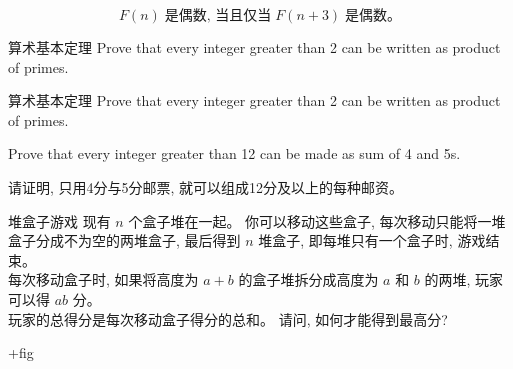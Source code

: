 
\begin{frame}{}
  \begin{exampleblock}{}
    \[
      F(n) \;\text{是偶数, 当且仅当}\; F(n+3) \;\text{是偶数。}
    \]
  \end{exampleblock}
\end{frame}

\begin{frame}{}
  \begin{exampleblock}{算术基本定理}
    Prove that every integer greater than 2 can be written as product of primes.
  \end{exampleblock}
\end{frame}

\begin{frame}{}
  \begin{exampleblock}{算术基本定理}
    Prove that every integer greater than 2 can be written as product of primes.
  \end{exampleblock}
\end{frame}

\begin{frame}{}
  \begin{exampleblock}{}
    Prove that every integer greater than 12 can be made as sum of 4 and 5s.

    请证明, 只用4分与5分邮票, 就可以组成12分及以上的每种邮资。
  \end{exampleblock}
\end{frame}

\begin{frame}{}
  \begin{exampleblock}{堆盒子游戏}
    现有 $n$ 个盒子堆在一起。
    你可以移动这些盒子, 每次移动只能将一堆盒子分成不为空的两堆盒子,
    最后得到 $n$ 堆盒子, 即每堆只有一个盒子时, 游戏结束。 \\[8pt]
    每次移动盒子时, 如果将高度为 $a + b$ 的盒子堆拆分成高度为 $a$ 和 $b$ 的两堆,
    玩家可以得 $ab$ 分。 \\[8pt]
    玩家的总得分是每次移动盒子得分的总和。
    请问, 如何才能得到最高分?
  \end{exampleblock}

  +fig
\end{frame}

